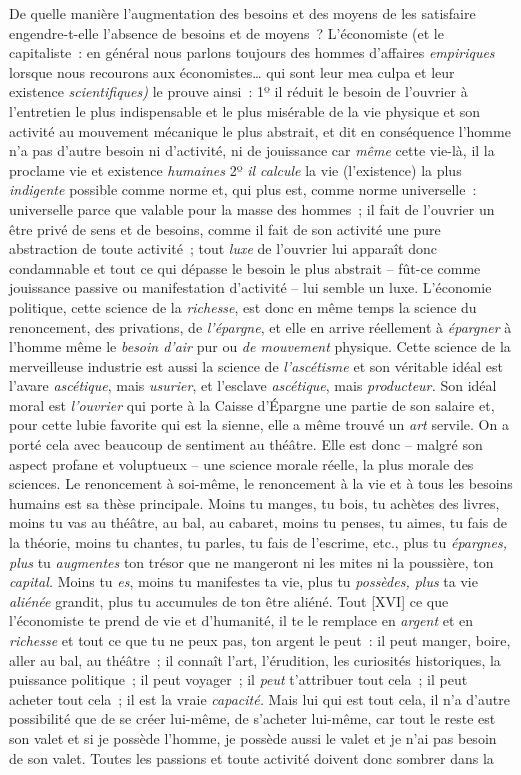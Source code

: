 \documentclass[french,twoside]{book} %
\begin{document}
De quelle manière l’augmentation des besoins et des moyens de les satisfaire engendre-t-elle l’absence de besoins et de moyens ? L’économiste (et le capitaliste : en général nous parlons toujours des hommes d’affaires \emph{empiriques} lorsque nous recourons aux économistes… qui sont leur mea culpa et leur existence \emph{scientifiques)} le prouve ainsi : 1º il réduit le besoin de l’ouvrier à l’entretien le plus indispensable et le plus misérable de la vie physique et son activité au mouvement mécanique le plus abstrait, et dit en conséquence l’homme n’a pas d’autre besoin ni d’activité, ni de jouissance car \emph{même} cette vie-là, il la proclame vie et existence \emph{humaines} 2º\emph{ il calcule} la vie (l’existence) la plus \emph{indigente} possible comme norme et, qui plus est, comme norme universelle : universelle parce que valable pour la masse des hommes ; il fait de l’ouvrier un être privé de sens et de besoins, comme il fait de son activité une pure abstraction de toute activité ; tout \emph{luxe} de l’ouvrier lui apparaît donc condamnable et tout ce qui dépasse le besoin le plus abstrait – fût-ce comme jouissance passive ou manifestation d’activité – lui semble un luxe. L’économie politique, cette science de la \emph{richesse}, est donc en même temps la science du renoncement, des privations, de \emph{l’épargne}, et elle en arrive réellement à \emph{épargner} à l’homme même le \emph{besoin d’air} pur ou \emph{de mouvement} physique. Cette science de la merveilleuse industrie est aussi la science de \emph{l’ascétisme} et son véritable idéal est l’avare \emph{ascétique}, mais \emph{usurier}, et l’esclave \emph{ascétique}, mais \emph{producteur.} Son idéal moral est \emph{l’ouvrier} qui porte à la Caisse d’Épargne une partie de son salaire et, pour cette lubie favorite qui est la sienne, elle a même trouvé un \emph{art} servile. On a porté cela avec beaucoup de sentiment au théâtre. Elle est donc – malgré son aspect profane et voluptueux – une science morale réelle, la plus morale des sciences. Le renoncement à soi-même, le renoncement à la vie et à tous les besoins humains est sa thèse principale. Moins tu manges, tu bois, tu achètes des livres, moins tu vas au théâtre, au bal, au cabaret, moins tu penses, tu aimes, tu fais de la théorie, moins tu chantes, tu parles, tu fais de l’escrime, etc., plus tu \emph{épargnes, plus} tu \emph{augmentes} ton trésor que ne mangeront ni les mites ni la poussière, ton \emph{capital.} Moins tu \emph{es}, moins tu manifestes ta vie, plus tu \emph{possèdes, plus} ta vie \emph{aliénée} grandit, plus tu accumules de ton être aliéné. Tout [XVI] ce que l’économiste te prend de vie et d’humanité, il te le remplace en \emph{argent} et en \emph{richesse} et tout ce que tu ne peux pas, ton argent le peut : il peut manger, boire, aller au bal, au théâtre ; il connaît l’art, l’érudition, les curiosités historiques, la puissance politique ; il peut voyager ; il \emph{peut} t’attribuer tout cela ; il peut acheter tout cela ; il est la vraie \emph{capacité.} Mais lui qui est tout cela, il n’a d’autre possibilité que de se créer lui-même, de s’acheter lui-même, car tout le reste est son valet et si je possède l’homme, je possède aussi le valet et je n’ai pas besoin de son valet. Toutes les passions et toute activité doivent donc sombrer dans la 
\end{document}
